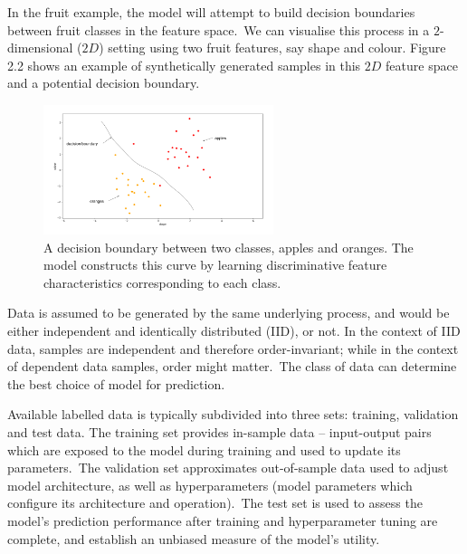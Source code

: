 \noindent In the fruit example, the model will attempt to build decision boundaries between fruit classes in the feature space.\ We can visualise this process in a $2$-dimensional ($ 2D $) setting using two fruit features, say shape and colour. Figure 2.2 shows an example of synthetically generated samples in this $ 2D $ feature space and a potential decision boundary.

\begin{figure}[H]
   	\centering
    	\includegraphics[width=0.6\textwidth, height=0.4\textwidth]{oranges_and_apples_decision_boundary}
	\captionsetup{justification=centering}
	\caption{A decision boundary between two classes, apples and oranges. The model constructs this curve by learning discriminative feature characteristics corresponding to each class.}
\end{figure}

\noindent Data is assumed to be generated by the same underlying process, and would be either independent and identically distributed (IID), or not. In the context of IID data, samples are independent and therefore order-invariant; while in the context of dependent data samples, order might matter.\ The class of data can determine the best choice of model for prediction. \par

\noindent Available labelled data is typically subdivided into three sets: training, validation and test data. The training set provides in-sample data -- input-output pairs which are exposed to the model during training and used to update its parameters.\ The validation set approximates out-of-sample data used to adjust model architecture, as well as hyperparameters (model parameters which configure its architecture and operation).\ The test set is used to assess the model's prediction performance after training and hyperparameter tuning are complete, and establish an unbiased measure of the model's utility.  \par

